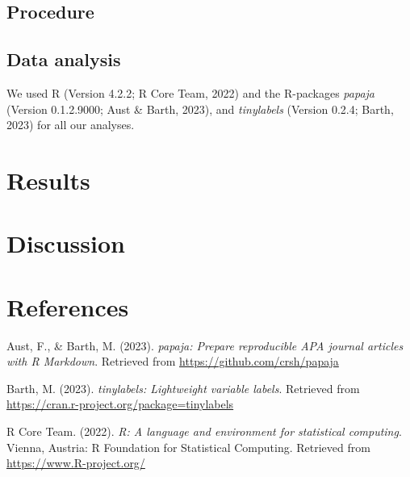 \documentclass[
  man]{apa6}
\newlength{\cslhangindent}
\newlength{\cslentryspacingunit} %
\newenvironment{CSLReferences}[2] %
 {%
  \setlength{\parindent}{0pt}
  \ifodd #1
  \let\oldpar\par
  \def\par{\hangindent=\cslhangindent\oldpar}
  \fi
  \setlength{\parskip}{#2\cslentryspacingunit}
 }%
 {}
\begin{document}
\hypertarget{procedure}{%
\subsection{Procedure}\label{procedure}}

\hypertarget{data-analysis}{%
\subsection{Data analysis}\label{data-analysis}}

We used R (Version 4.2.2; R Core Team, 2022) and the R-packages \emph{papaja} (Version 0.1.2.9000; Aust \& Barth, 2023), and \emph{tinylabels} (Version 0.2.4; Barth, 2023) for all our analyses.

\hypertarget{results}{%
\section{Results}\label{results}}

\hypertarget{discussion}{%
\section{Discussion}\label{discussion}}

\newpage

\hypertarget{references}{%
\section{References}\label{references}}

\hypertarget{refs}{}
\begin{CSLReferences}{1}{0}
\leavevmode{}%
Aust, F., \& Barth, M. (2023). \emph{{papaja}: {Prepare} reproducible {APA} journal articles with {R Markdown}}. Retrieved from \url{https://github.com/crsh/papaja}

\leavevmode{}%
Barth, M. (2023). \emph{{tinylabels}: Lightweight variable labels}. Retrieved from \url{https://cran.r-project.org/package=tinylabels}

\leavevmode{}%
R Core Team. (2022). \emph{R: A language and environment for statistical computing}. Vienna, Austria: R Foundation for Statistical Computing. Retrieved from \url{https://www.R-project.org/}

\end{CSLReferences}
\end{document}
